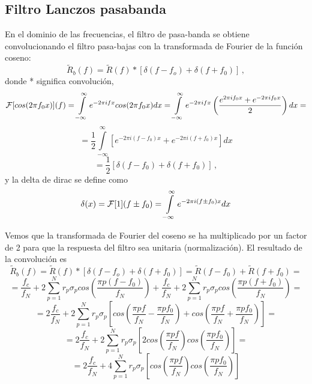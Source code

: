 \documentclass[
]{agujournal2019}
\begin{document}
\subsection{Filtro Lanczos pasabanda}

En el dominio de las frecuencias, el filtro de pasa-banda se obtiene
convolucionando el filtro pasa-bajas con la transformada de Fourier de
la función coseno:
\[\widetilde{R}_b(f)=\widetilde{R}(f)*\left[\delta(f-f_o) + \delta(f+f_0) \right]\,,\]
donde * significa convolución,
\[{\cal F}[cos(2\pi f_0 x)](f)=\int\limits^{\infty}_{-\infty} e^{-2\pi i f x} cos(2\pi
f_0 x) dx=\int\limits^{\infty}_{-\infty} e^{-2\pi i f x}
\left(\frac{e^{2\pi i f_0 x} +e^{-2\pi i f_0 x}}{2}\right) dx = \]
\[=\frac{1}{2}\int\limits^{\infty}_{-\infty}\left[e^{-2\pi i (f-f_0) x} + e^{-2\pi i (f+f_0) x} \right] dx\]
\[=\frac{1}{2}\left[ \delta(f-f_0) + \delta(f+f_0)\right]\,,\] y la
delta de dirac se define como
\[\delta(x)={\cal F}[1](f\pm f_0)=\int\limits^{\infty}_{-\infty} e^{-2\pi i (f\pm f_0) x} dx\]

Vemos que la transformada de Fourier del coseno se ha multiplicado por
un factor de 2 para que la respuesta del filtro sea unitaria
(normalización). El resultado de la convolución es
\[\widetilde{R}_b(f)=\widetilde{R}(f)*\left[\delta(f-f_o) + \delta(f+f_0) \right]=
\widetilde{R}(f-f_0)+\widetilde{R}(f+f_0)=\]
\[=\frac{f_c}{f_N}+ 2\sum\limits^{N}_{p=1}
{r_p} \sigma_p cos\left( \frac{\pi p (f-f_0)}{f_N}\right) +
\frac{f_c}{f_N}+ 2\sum\limits^{N}_{p=1}
{r_p} \sigma_p cos\left( \frac{\pi p (f+f_0)}{f_N}\right)=\]
\[=2\frac{f_c}{f_N}+ 2\sum\limits^{N}_{p=1}
{r_p} \sigma_p \left[ cos\left( \frac{\pi p f}{f_N} - \frac{\pi p f_0}{f_N}\right) +
cos\left( \frac{\pi p f}{f_N} + \frac{\pi p f_0}{f_N}\right)\right]=\]
\[=2\frac{f_c}{f_N}+ 2\sum\limits^{N}_{p=1} r_p \sigma_p\left[
2cos\left( \frac{\pi p f}{f_N}\right) cos\left( \frac{\pi p f_0}{f_N}\right)\right]=\]
\[=2\frac{f_c}{f_N}+ 4\sum\limits^{N}_{p=1} r_p \sigma_p\left[
cos\left( \frac{\pi p f}{f_N}\right) cos\left( \frac{\pi p f_0}{f_N}\right)\right]\]

\begin{center}
\end{center}
\end{document}

